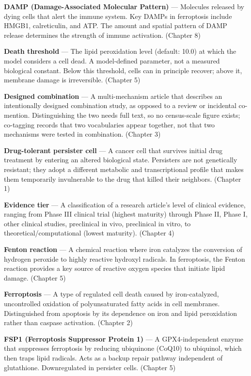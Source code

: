 \documentclass[11pt,twoside,openright]{report}
\begin{document}
\textbf{DAMP (Damage-Associated Molecular Pattern)} --- Molecules released by dying cells that alert the immune system. Key DAMPs in ferroptosis include HMGB1, calreticulin, and ATP. The amount and spatial pattern of DAMP release determines the strength of immune activation. (Chapter 8)

\textbf{Death threshold} --- The lipid peroxidation level (default: 10.0) at which the model considers a cell dead. A model-defined parameter, not a measured biological constant. Below this threshold, cells can in principle recover; above it, membrane damage is irreversible. (Chapter 5)

\textbf{Designed combination} --- A multi-mechanism article that describes an intentionally designed combination study, as opposed to a review or incidental co-mention. Distinguishing the two needs full text, so no census-scale figure exists; co-tagging records that two vocabularies appear together, not that two mechanisms were tested in combination. (Chapter 3)

\textbf{Drug-tolerant persister cell} --- A cancer cell that survives initial drug treatment by entering an altered biological state. Persisters are not genetically resistant; they adopt a different metabolic and transcriptional profile that makes them temporarily invulnerable to the drug that killed their neighbors. (Chapter 1)

\textbf{Evidence tier} --- A classification of a research article's level of clinical evidence, ranging from Phase III clinical trial (highest maturity) through Phase II, Phase I, other clinical studies, preclinical in vivo, preclinical in vitro, to theoretical/computational (lowest maturity). (Chapter 4)

\textbf{Fenton reaction} --- A chemical reaction where iron catalyzes the conversion of hydrogen peroxide to highly reactive hydroxyl radicals. In ferroptosis, the Fenton reaction provides a key source of reactive oxygen species that initiate lipid damage. (Chapter 5)

\textbf{Ferroptosis} --- A type of regulated cell death caused by iron-catalyzed, uncontrolled oxidation of polyunsaturated fatty acids in cell membranes. Distinguished from apoptosis by its dependence on iron and lipid peroxidation rather than caspase activation. (Chapter 2)

\textbf{FSP1 (Ferroptosis Suppressor Protein 1)} --- A GPX4-independent enzyme that suppresses ferroptosis by reducing ubiquinone (CoQ10) to ubiquinol, which then traps lipid radicals. Acts as a backup repair pathway independent of glutathione. Downregulated in persister cells. (Chapter 5)
\end{document}
